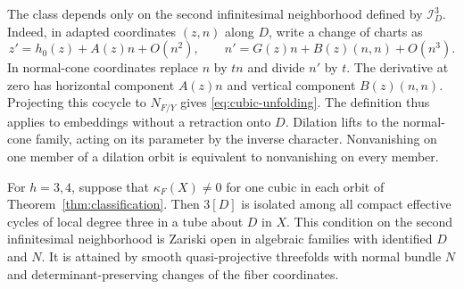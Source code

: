 The class depends only on the second infinitesimal neighborhood
defined by $\mathcal I_D^3$. Indeed, in adapted coordinates $(z,n)$
along $D$, write a change of charts as
\[
  z'=h_0(z)+A(z)n+O(n^2),\qquad
  n'=G(z)n+B(z)(n,n)+O(n^3).
\]
In normal-cone coordinates replace $n$ by $tn$ and divide $n'$ by
$t$. The derivative at zero has horizontal component $A(z)n$
and vertical component $B(z)(n,n)$. Projecting this cocycle to
$N_{F/Y}$ gives \eqref{eq:cubic-unfolding}. The definition thus
applies to embeddings without a retraction onto $D$. Dilation
lifts to the normal-cone family, acting on its parameter by the
inverse character. Nonvanishing on one member of a dilation orbit
is equivalent to nonvanishing on every member.

\begin{proposition}\label{prop:isolation}
For $h=3,4$, suppose that $\kappa_F(X)\ne0$ for one cubic in
each orbit of Theorem~\ref{thm:classification}. Then $3[D]$ is
isolated among all compact effective cycles of local degree three
in a tube about $D$ in $X$. This condition on the second
infinitesimal neighborhood is Zariski open in algebraic families
with identified $D$ and $N$. It is attained by smooth
quasi-projective threefolds with normal bundle $N$ and
determinant-preserving changes of the fiber coordinates.
\end{proposition}

